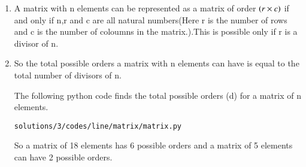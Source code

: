 \renewcommand{\theequation}{\theenumi}
\begin{enumerate}[label=\thesection.\arabic*.,ref=\thesection.\theenumi]

\item A matrix with n elements can be represented as a matrix of order $\left(r\times c\right)$ if and only if n,r and c are all natural numbers(Here r is the number of rows and c is the number of coloumns in the matrix.).This is possible only if r is a divisor of n.

\item So the total possible orders a matrix with n elements can have is equal to the total number of divisors of n.

The following python code finds the total possible orders (d) for a matrix of n elements. 
\begin{lstlisting}
solutions/3/codes/line/matrix/matrix.py
\end{lstlisting}
So a matrix of 18 elements has 6 possible orders and a matrix of 5 elements can have 2 possible orders.
\end{enumerate}
